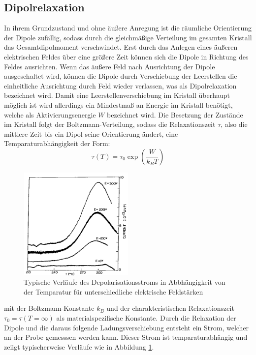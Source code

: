 \subsection{Dipolrelaxation}
In ihrem Grundzustand und ohne äußere Anregung ist die räumliche Orientierung der Dipole zufällig, sodass durch die gleichmäßige Verteilung im gesamten Kristall das Gesamtdipolmoment verschwindet. Erst durch das Anlegen eines äußeren elektrischen Feldes über eine größere Zeit können sich die Dipole in Richtung des Feldes ausrichten. Wenn das äußere Feld nach Ausrichtung der Dipole ausgeschaltet wird, können die Dipole durch Verschiebung der Leerstellen die einheitliche Ausrichtung durch Feld wieder verlassen, was als Dipolrelaxation bezeichnet wird. Damit eine Leerstellenverschiebung im Kristall überhaupt möglich ist wird allerdings ein Mindestmaß an Energie im Kristall benötigt, welche als Aktivierungsenergie $W$ bezeichnet wird. Die Besetzung der Zustände im Kristall folgt der Boltzmann-Verteilung, sodass die Relaxationszeit $\tau$, also die mittlere Zeit bis ein Dipol seine Orientierung ändert, eine Temparaturabhängigkeit der Form:
\begin{equation}
\tau(T)=\tau_0\exp\left(\frac{W}{k_BT}\right)
\end{equation}
\begin{figure}
\centering
\includegraphics[width=0.5\textwidth,keepaspectratio]{Depolarisationsstrom}
\caption{Typische Verläufe des Depolarisationsstroms in Abbhängigkeit von der Temparatur für unterschiedliche elektrische Feldstärken}
\label{fig:Depolarisationsstrom}
\end{figure}
mit der Boltzmann-Konstante $k_B$ und der charakteristischen Relaxationszeit $\tau_0=\tau(T=\infty)$ als materialspezifische Konstante. Durch die Relaxation der Dipole und die daraus folgende Ladungsverschiebung entsteht ein Strom, welcher an der Probe gemesssen werden kann. 
Dieser Strom ist temparaturabhängig und zeiigt typischerweise Verläufe wie in Abbildung \ref{fig:Depolarisationsstrom}.
